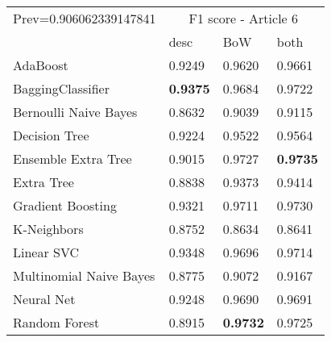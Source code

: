\begin{tabular}{|l|l|l|l| }
\hline
Prev=0.906062339147841 &  \multicolumn{3}{c|}{F1 score - Article 6} \\
\cline{2-4} & desc & BoW & both \\ \hline
AdaBoost                & 0.9249 & 0.9620 & 0.9661\\
BaggingClassifier       & {\bf 0.9375} & 0.9684 & 0.9722\\
Bernoulli Naive Bayes   & 0.8632 & 0.9039 & 0.9115\\
Decision Tree           & 0.9224 & 0.9522 & 0.9564\\
Ensemble Extra Tree     & 0.9015 & 0.9727 & {\bf 0.9735}\\
Extra Tree              & 0.8838 & 0.9373 & 0.9414\\
Gradient Boosting       & 0.9321 & 0.9711 & 0.9730\\
K-Neighbors             & 0.8752 & 0.8634 & 0.8641\\
Linear SVC              & 0.9348 & 0.9696 & 0.9714\\
Multinomial Naive Bayes & 0.8775 & 0.9072 & 0.9167\\
Neural Net              & 0.9248 & 0.9690 & 0.9691\\
Random Forest           & 0.8915 & {\bf 0.9732} & 0.9725\\
\hline
\end{tabular}